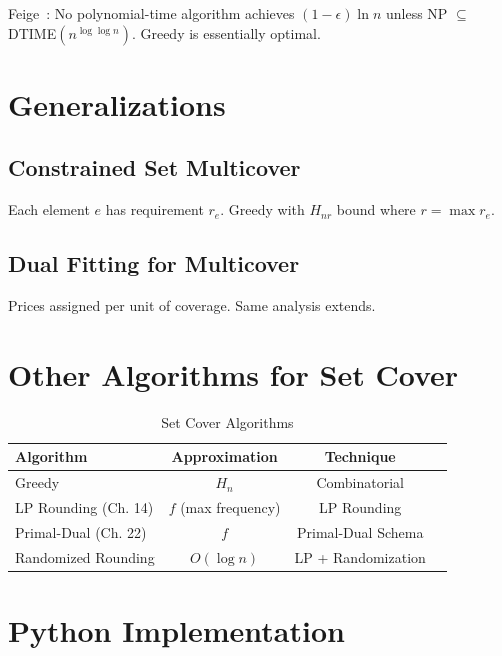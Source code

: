 Feige~\cite{feige98}: No polynomial-time algorithm achieves $(1-\epsilon)\ln n$ unless NP $\subseteq$ DTIME$(n^{\log\log n})$. Greedy is essentially optimal.

\section{Generalizations}

\subsection{Constrained Set Multicover}
Each element $e$ has requirement $r_e$. Greedy with $H_{nr}$ bound where $r = \max r_e$.

\subsection{Dual Fitting for Multicover}
Prices assigned per unit of coverage. Same analysis extends.

\section{Other Algorithms for Set Cover}

\begin{table}[H]
\centering
\caption{Set Cover Algorithms}
\begin{tabular}{lccc}
\toprule
Algorithm & Approximation & Technique \\
\midrule
Greedy & $H_n$ & Combinatorial \\
LP Rounding (Ch. 14) & $f$ (max frequency) & LP Rounding \\
Primal-Dual (Ch. 22) & $f$ & Primal-Dual Schema \\
Randomized Rounding & $O(\log n)$ & LP + Randomization \\
\bottomrule
\end{tabular}
\end{table}

\section{Python Implementation}

